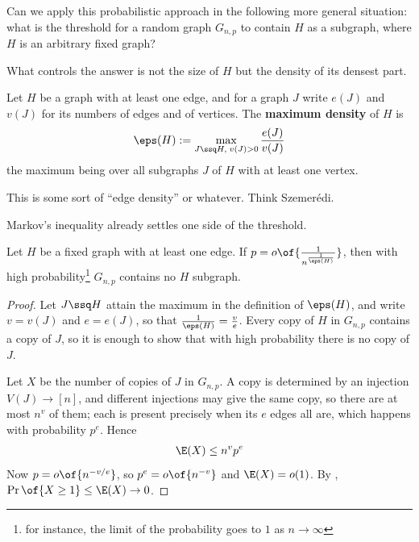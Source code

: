 Can we apply this probabilistic approach in the following more general situation: what is the threshold for a random graph $G_{n, p}$ to contain $H$ as a subgraph, where $H$ is an arbitrary fixed graph?

What controls the answer is not the size of $H$ but the density of its densest part.

\begin{boxdefinition}
    Let $H$ be a graph with at least one edge, and for a graph $J$ write $e(J)$ and $v(J)$ for its numbers of edges and of vertices. The \textbf{maximum density} of $H$ is
    \begin{align*}
        \eps(H) := \max_{J \ssq H, \; v(J) > 0} \frac{e(J)}{v(J)}
    \end{align*}
    the maximum being over all subgraphs $J$ of $H$ with at least one vertex.
\end{boxdefinition}

This is some sort of ``edge density'' or whatever. Think Szemer\'{e}di.

Markov's inequality already settles one side of the threshold.

\begin{boxtheorem} \label{Ch3:Thm:Subgraph_Threshold}
    Let $H$ be a fixed graph with at least one edge. If $p = o\of{\frac{1}{n^{\frac{1}{\eps(H)}}}}$, then with high probability\footnote{for instance, the limit of the probability goes to $1$ as $n \to \infty$} $G_{n, p}$ contains no $H$ subgraph.
\end{boxtheorem}
\begin{proof}
    Let $J \ssq H$ attain the maximum in the definition of $\eps(H)$, and write $v = v(J)$ and $e = e(J)$, so that $\frac{1}{\eps(H)} = \frac{v}{e}$. Every copy of $H$ in $G_{n, p}$ contains a copy of $J$, so it is enough to show that with high probability there is no copy of $J$.

    Let $X$ be the number of copies of $J$ in $G_{n, p}$. A copy is determined by an injection $V(J) \to [n]$, and different injections may give the same copy, so there are at most $n^{v}$ of them; each is present precisely when its $e$ edges all are, which happens with probability $p^{e}$. Hence
    \begin{align*}
        \E(X) \leq n^{v} p^{e}
    \end{align*}
    Now $p = o\of{n^{-v/e}}$, so $p^{e} = o\of{n^{-v}}$ and $\E(X) = o(1)$. By , $\Pr\of{X \geq 1} \leq \E(X) \to 0$.
\end{proof}

